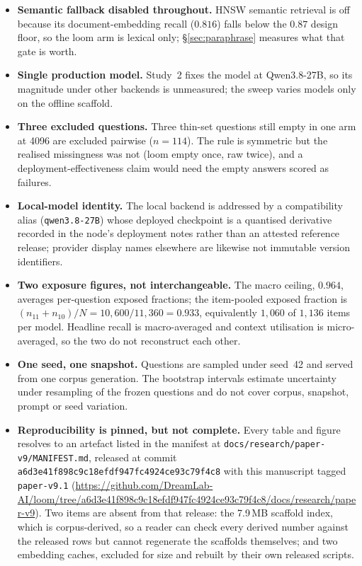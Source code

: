 \documentclass[10pt,twocolumn]{article}
\begin{document}
\begin{itemize}[topsep=2pt,itemsep=2pt,leftmargin=1.4em]
\item \textbf{Semantic fallback disabled throughout.} HNSW semantic retrieval is off because its document-embedding recall ($0.816$) falls below the $0.87$ design floor, so the loom arm is lexical only; \S\ref{sec:paraphrase} measures what that gate is worth.
\item \textbf{Single production model.} Study~2 fixes the model at Qwen3.8-27B, so its magnitude under other backends is unmeasured; the sweep varies models only on the offline scaffold.
\item \textbf{Three excluded questions.} Three thin-set questions still empty in one arm at 4096 are excluded pairwise ($n=114$). The rule is symmetric but the realised missingness was not (loom empty once, raw twice), and a deployment-effectiveness claim would need the empty answers scored as failures.
\item \textbf{Local-model identity.} The local backend is addressed by a compatibility alias (\texttt{qwen3.8-27B}) whose deployed checkpoint is a quantised derivative recorded in the node's deployment notes rather than an attested reference release; provider display names elsewhere are likewise not immutable version identifiers.
\item \textbf{Two exposure figures, not interchangeable.} The macro ceiling, $0.964$, averages per-question exposed fractions; the item-pooled exposed fraction is $(n_{11}+n_{10})/N=10{,}600/11{,}360=0.933$, equivalently $1{,}060$ of $1{,}136$ items per model. Headline recall is macro-averaged and context utilisation is micro-averaged, so the two do not reconstruct each other.
\item \textbf{One seed, one snapshot.} Questions are sampled under seed~42 and served from one corpus generation. The bootstrap intervals estimate uncertainty under resampling of the frozen questions and do not cover corpus, snapshot, prompt or seed variation.
\item \textbf{Reproducibility is pinned, but not complete.} Every table and figure resolves to an artefact listed in the manifest at \texttt{docs/research/paper-v9/MANIFEST.md}, released at commit \texttt{a6d3e41f898c9c18efdf947fc4924ce93c79f4c8} with this manuscript tagged \texttt{paper-v9.1} (\url{https://github.com/DreamLab-AI/loom/tree/a6d3e41f898c9c18efdf947fc4924ce93c79f4c8/docs/research/paper-v9}). Two items are absent from that release: the 7.9\,MB scaffold index, which is corpus-derived, so a reader can check every derived number against the released rows but cannot regenerate the scaffolds themselves; and two embedding caches, excluded for size and rebuilt by their own released scripts.

\end{itemize}
\end{document}
